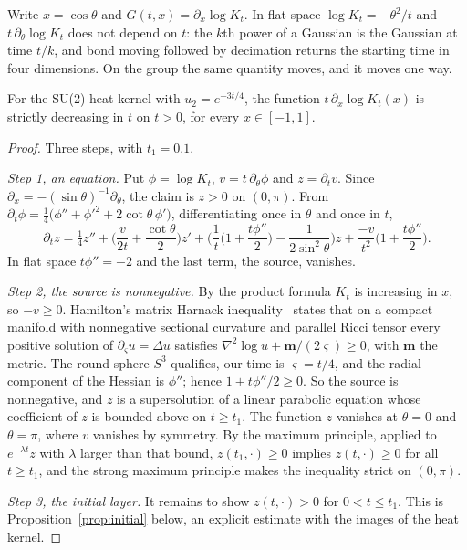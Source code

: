 Write $x=\cos\theta$ and $G(t,x)=\partial_x\log K_t$. In flat space $\log K_t=-\theta^2/t$ and $t\,\partial_\theta\log K_t$ does not depend on $t$: the $k$th power of a Gaussian is the Gaussian at time $t/k$, and bond moving followed by decimation returns the starting time in four dimensions. On the group the same quantity moves, and it moves one way.

\begin{theorem}\label{thm:scaledmlr}
For the SU(2) heat kernel with $u_2=e^{-3t/4}$, the function $t\,\partial_x\log K_t(x)$ is strictly decreasing in $t$ on $t>0$, for every $x\in[-1,1]$.
\end{theorem}

\begin{proof}
Three steps, with $t_1=0.1$.

\emph{Step 1, an equation.} Put $\phi=\log K_t$, $v=t\,\partial_\theta\phi$ and $z=\partial_tv$. Since $\partial_x=-(\sin\theta)^{-1}\partial_\theta$, the claim is $z>0$ on $(0,\pi)$. From $\partial_t\phi=\frac14\big(\phi''+\phi'^2+2\cot\theta\,\phi'\big)$, differentiating once in $\theta$ and once in $t$,
\[
\partial_tz=\tfrac14z''+\Big(\frac{v}{2t}+\frac{\cot\theta}{2}\Big)z'+\Big(\frac1t\Big(1+\frac{t\phi''}{2}\Big)-\frac{1}{2\sin^2\theta}\Big)z+\frac{-v}{t^2}\Big(1+\frac{t\phi''}{2}\Big).
\]
In flat space $t\phi''=-2$ and the last term, the source, vanishes.

\emph{Step 2, the source is nonnegative.} By the product formula $K_t$ is increasing in $x$, so $-v\ge0$. Hamilton's matrix Harnack inequality~\cite{Ha93} states that on a compact manifold with nonnegative sectional curvature and parallel Ricci tensor every positive solution of $\partial_\varsigma u=\Delta u$ satisfies $\nabla^2\log u+\mathbf m/(2\varsigma)\ge0$, with $\mathbf m$ the metric. The round sphere $S^3$ qualifies, our time is $\varsigma=t/4$, and the radial component of the Hessian is $\phi''$; hence $1+t\phi''/2\ge0$. So the source is nonnegative, and $z$ is a supersolution of a linear parabolic equation whose coefficient of $z$ is bounded above on $t\ge t_1$. The function $z$ vanishes at $\theta=0$ and $\theta=\pi$, where $v$ vanishes by symmetry. By the maximum principle, applied to $e^{-\lambda t}z$ with $\lambda$ larger than that bound, $z(t_1,\cdot)\ge0$ implies $z(t,\cdot)\ge0$ for all $t\ge t_1$, and the strong maximum principle makes the inequality strict on $(0,\pi)$.

\emph{Step 3, the initial layer.} It remains to show $z(t,\cdot)>0$ for $0<t\le t_1$. This is Proposition~\ref{prop:initial} below, an explicit estimate with the images of the heat kernel.
\end{proof}

